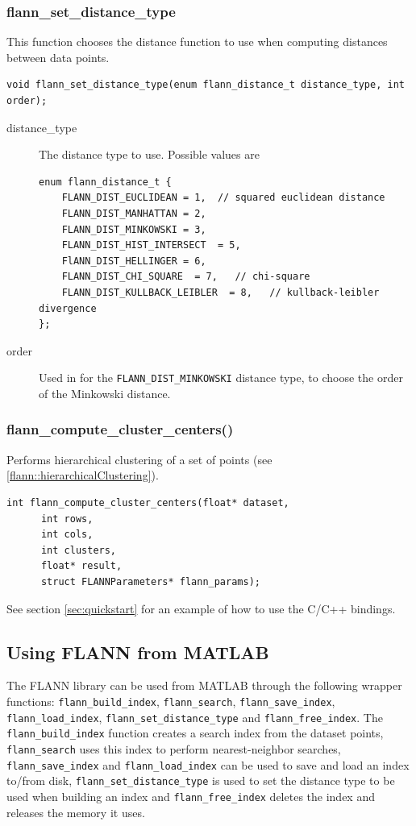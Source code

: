 \documentclass[letter,10pt]{article}
\begin{document}
\subsubsection{flann\_set\_distance\_type}
\label{flann::setDistanceType}
This function chooses the distance function to use when computing distances between
data points.
\begin{Verbatim}[fontsize=\footnotesize,frame=single]
void flann_set_distance_type(enum flann_distance_t distance_type, int order);
\end{Verbatim}
\begin{description}
\item[distance\_type] The distance type to use. Possible values are
\begin{Verbatim}[fontsize=\footnotesize]
enum flann_distance_t {
	FLANN_DIST_EUCLIDEAN = 1,  // squared euclidean distance
	FLANN_DIST_MANHATTAN = 2,
	FLANN_DIST_MINKOWSKI = 3,
	FLANN_DIST_HIST_INTERSECT  = 5,
	FlANN_DIST_HELLINGER = 6,
	FLANN_DIST_CHI_SQUARE  = 7,   // chi-square
	FLANN_DIST_KULLBACK_LEIBLER  = 8,   // kullback-leibler divergence
};
\end{Verbatim}
\item[order] Used in for the \texttt{FLANN\_DIST\_MINKOWSKI} distance type, to choose the order of the Minkowski distance.
\end{description}




\subsubsection{flann\_compute\_cluster\_centers()}
Performs hierarchical clustering of a set of points (see \ref{flann::hierarchicalClustering}).
\begin{Verbatim}[fontsize=\footnotesize,frame=single]
int flann_compute_cluster_centers(float* dataset,
      int rows,
      int cols,
      int clusters,
      float* result,
      struct FLANNParameters* flann_params);
\end{Verbatim}


\bigskip

See section \ref{sec:quickstart} for an example of how to use the C/C++
bindings.


\subsection{Using FLANN from MATLAB}

The FLANN library can be used from MATLAB through the following wrapper
functions: \texttt{flann\_build\_index}, \texttt{flann\_search},
\texttt{flann\_save\_index}, \texttt{flann\_load\_index},
\texttt{flann\_set\_distance\_type} and \texttt{flann\_free\_index}. 
The \texttt{flann\_build\_index} function
creates a search index from the dataset points, \texttt{flann\_search} uses
this index to perform nearest-neighbor searches, \texttt{flann\_save\_index} 
and \texttt{flann\_load\_index} can be used to save and load an index
to/from disk, \texttt{flann\_set\_distance\_type} is used to set the
distance type to be used when building an index and
\texttt{flann\_free\_index} deletes the index and releases the memory it
uses.
\end{document}
